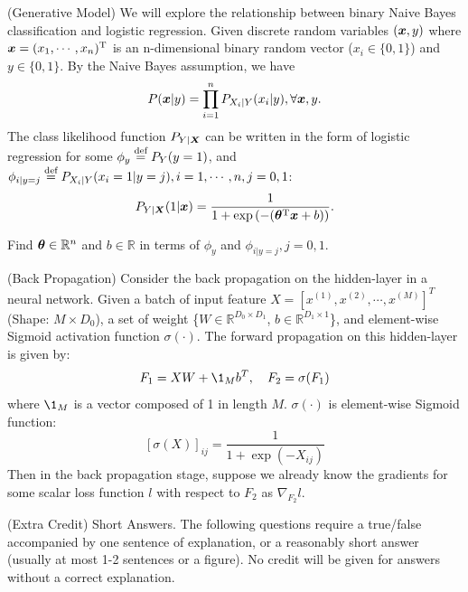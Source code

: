 \documentclass[a4paper,answers,12pt]{exam} %
\begin{document}
\begin{questions}
\question[20](Generative Model) We will explore the relationship between binary Naive Bayes classification and logistic regression.  %
Given discrete random variables $(\bm{x}, y)$ where %
$\bm{x}=(x_1,\cdots,x_n)^{\mathrm{T}}$ is an n-dimensional binary random vector ($x_i\in\{0,1\}$)  and $y\in\{0,1\}$. By the Naive Bayes assumption,  we have %
\[
    P(\bm{x}|y)=\prod_{i=1}^{n} P_{X_i|Y} (x_i|y), \forall \bm{x}, y.
\]
The class likelihood function $P_{Y|\bm{X}}$   can be written in the form of logistic regression for some $\phi_y\stackrel{\text{def}}{=} P_Y(y=1)$, and $\phi_{i|y=j}\stackrel{\text{def}}{=} P_{X_i|Y} (x_i=1|y=j), i=1,\cdots,n, j=0,1$:
\begin{align*}
    P_{Y|\bm{X}}(1|\bm{x}) = \frac{1}{1+\exp{(-(\bm{\theta}^{\mathrm{T}}\bm{x}+b))}}.
\end{align*}

Find $\bm{\theta}\in\mathbb{R}^n$ and $b\in\mathbb{R}$ in terms of $\phi_y$ and $\phi_{i|y=j},j=0,1$.

  
  \question[20] (Back Propagation) Consider the back propagation on the hidden-layer in a neural network. Given a batch of input feature $X=[x^{(1)}, x^{(2)}, \cdots, x^{(M)}]^T$ (Shape: $M\times D_0$), a set of weight \{$W\in\mathbb{R}^{D_0\times D_1}$, $b\in\mathbb{R}^{D_1\times 1}$\}, and element-wise Sigmoid activation function $\sigma(\cdot)$. The forward propagation on this hidden-layer is given by:
  \[
  F_1=XW+\1_Mb^T, \quad F_2=\sigma(F_1)
  \]
  where $\1_M$ is a vector composed of 1 in length $M$. $\sigma(\cdot)$ is element-wise Sigmoid function:
  \[
  [\sigma(X)]_{ij}=\frac{1}{1+\exp(-X_{ij})}
  \]
  Then in the back propagation stage, suppose we already know the gradients for some scalar loss function $l$ with respect to $F_2$ as $\nabla_{F_2}l$.
\question (Extra Credit) Short Answers.
The following questions require a true/false accompanied by one sentence of explanation,
or a reasonably short answer (usually at most 1-2 sentences or a figure).
No credit will be given for answers without
a correct explanation.
\begin{parts}

\end{parts}
\end{questions}
\end{document}
